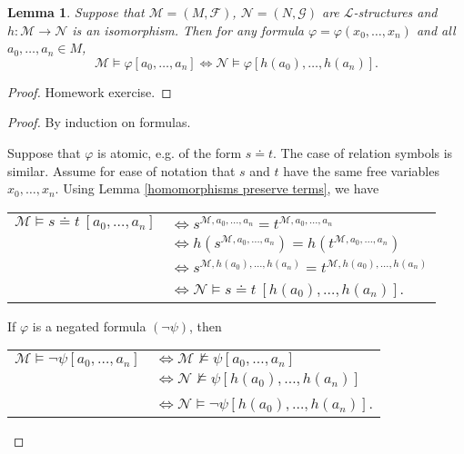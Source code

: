 \documentclass[a4paper, 11pt]{amsart}
\newtheorem{lemma}[lemma]{Lemma}
\theoremstyle{remark}
\newcommand{\cF}{\mathcal F}
\newcommand{\cG}{\mathcal G}
\newcommand{\cL}{\mathcal L}
\newcommand{\cM}{\mathcal M}
\newcommand{\cN}{\mathcal N}
\begin{document}
\begin{lemma} 
\label{isomorphisms preserve truth} 
Suppose that $\cM=(M,\cF)$, $\cN=(N,\cG)$ are $\cL$-structures and $h\colon \cM\rightarrow \cN$ is an isomorphism. 
Then for any formula $\varphi=\varphi(x_0,\dots,x_n)$ and all $a_0,\dots,a_n\in M$, 
$$ \cM \models \varphi [a_0,\dots,a_n] \Longleftrightarrow \cN \models \varphi [h(a_0),\dots,h(a_n)].$$ 
\end{lemma} 
\begin{proof} 
Homework exercise. 
\end{proof} 
\iffalse 
\begin{proof} 
By induction on formulas. 

Suppose that $\varphi$ is atomic, e.g. of the form $s\doteq t$. 
The case of relation symbols is similar. 
Assume for ease of notation that $s$ and $t$ have the same free variables $x_0,\dots,x_n$. 
Using Lemma \ref{homomorphisms preserve terms}, we have 


\medskip 
\begin{tabular}{ll}
$\cM \models s\doteq t\ [a_0,\dots,a_n]$ & $\Longleftrightarrow s^{\cM,a_0,\dots,a_n}=t^{\cM,a_0,\dots,a_n}$ \\ 
& $\Longleftrightarrow h(s^{\cM,a_0,\dots,a_n})=h(t^{\cM,a_0,\dots,a_n})$ \\ 
& $\Longleftrightarrow s^{\cM,h(a_0),\dots,h(a_n)}=t^{\cM,h(a_0),\dots,h(a_n)}$ \\ 
& $\Longleftrightarrow \cN \models s\doteq t\ [h(a_0),\dots,h(a_n)]$. 
\end{tabular} 
\medskip 

If $\varphi$ is a negated formula $(\neg \psi)$, then 

\medskip 
\begin{tabular}{rl}
$\cM \models \neg\psi[a_0,\dots,a_n]$ & $\Longleftrightarrow \cM \not\models \psi [a_0,\dots,a_n]$ \\ 
& $\Longleftrightarrow \cN \not\models \psi [h(a_0),\dots,h(a_n)]$ \\ 
& $\Longleftrightarrow \cN \models \neg\psi [h(a_0),\dots,h(a_n)]$. 
\end{tabular} 
\medskip 


\end{proof}
\end{document}
